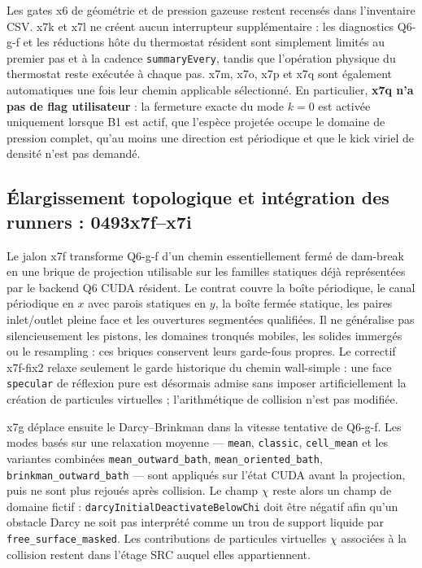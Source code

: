\documentclass[11pt,a4paper]{article}
\begin{document}
Les gates x6 de géométrie et de pression gazeuse restent recensés dans l'inventaire CSV. x7k et x7l ne créent aucun interrupteur supplémentaire : les diagnostics Q6-g-f et les réductions hôte du thermostat résident sont simplement limités au premier pas et à la cadence \texttt{summaryEvery}, tandis que l'opération physique du thermostat reste exécutée à chaque pas. x7m, x7o, x7p et x7q sont également automatiques une fois leur chemin applicable sélectionné. En particulier, \textbf{x7q n'a pas de flag utilisateur} : la fermeture exacte du mode $k=0$ est activée uniquement lorsque B1 est actif, que l'espèce projetée occupe le domaine de pression complet, qu'au moins une direction est périodique et que le kick viriel de densité n'est pas demandé.

\subsection{Élargissement topologique et intégration des runners : 0493x7f--x7i}

Le jalon x7f transforme Q6-g-f d'un chemin essentiellement fermé de dam-break en une brique de projection utilisable sur les familles statiques déjà représentées par le backend Q6 CUDA résident. Le contrat couvre la boîte périodique, le canal périodique en $x$ avec parois statiques en $y$, la boîte fermée statique, les paires inlet/outlet pleine face et les ouvertures segmentées qualifiées. Il ne généralise pas silencieusement les pistons, les domaines tronqués mobiles, les solides immergés ou le resampling : ces briques conservent leurs garde-fous propres. Le correctif x7f-fix2 relaxe seulement le garde historique du chemin wall-simple : une face \texttt{specular} de réflexion pure est désormais admise sans imposer artificiellement la création de particules virtuelles ; l'arithmétique de collision n'est pas modifiée.

x7g déplace ensuite le Darcy--Brinkman dans la vitesse tentative de Q6-g-f. Les modes basés sur une relaxation moyenne --- \texttt{mean}, \texttt{classic}, \texttt{cell\_mean} et les variantes combinées \texttt{mean\_outward\_bath}, \texttt{mean\_oriented\_bath}, \texttt{brinkman\_outward\_bath} --- sont appliqués sur l'état CUDA avant la projection, puis ne sont plus rejoués après collision. Le champ $\chi$ reste alors un champ de domaine fictif : \texttt{darcyInitialDeactivateBelowChi} doit être négatif afin qu'un obstacle Darcy ne soit pas interprété comme un trou de support liquide par \texttt{free\_surface\_masked}. Les contributions de particules virtuelles $\chi$ associées à la collision restent dans l'étage SRC auquel elles appartiennent.
\end{document}
